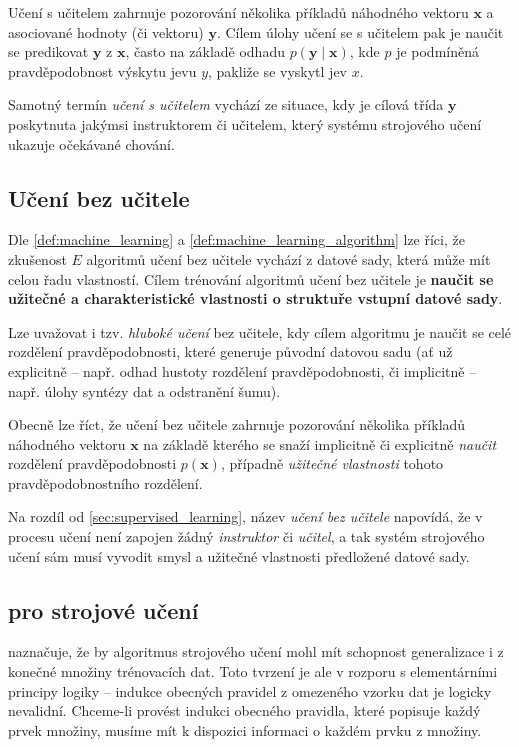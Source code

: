 Učení s učitelem zahrnuje pozorování několika příkladů náhodného vektoru $\mathbf{x}$ a asociované hodnoty (či vektoru) $\mathbf{y}$.
Cílem úlohy učení se s učitelem pak je naučit se predikovat $\mathbf{y}$ z $\mathbf{x}$, často na základě odhadu $p(\mathbf{y}\mid\mathbf{x})$, kde $p$ je podmíněná pravděpodobnost výskytu jevu $y$, pakliže se vyskytl jev $x$. \cite{Goodfellow2016}

Samotný termín \emph{učení s učitelem} vychází ze situace, kdy je cílová třída $\mathbf{y}$ poskytnuta jakýmsi instruktorem či učitelem, který systému strojového učení ukazuje očekávané chování. \cite{Goodfellow2016}
\subsection{Učení bez učitele}
\label{sec:unsupervised_learning}
Dle \autoref{def:machine_learning} a \autoref{def:machine_learning_algorithm} lze říci, že zkušenost $E$ algoritmů učení bez učitele vychází z datové sady, která může mít celou řadu vlastností.
Cílem trénování algoritmů učení bez učitele je \textbf{naučit se užitečné a charakteristické vlastnosti o struktuře vstupní datové sady}.

Lze uvažovat i tzv. \emph{hluboké učení} bez učitele, kdy cílem algoritmu je naučit se celé rozdělení pravděpodobnosti, které generuje původní datovou sadu (ať už explicitně – např. odhad hustoty rozdělení pravděpodobnosti, či implicitně – např. úlohy syntézy dat a odstranění šumu). \cite{Chollet2017}

Obecně lze říct, že učení bez učitele zahrnuje pozorování několika příkladů náhodného vektoru $\mathbf{x}$ na základě kterého se snaží implicitně či explicitně \emph{naučit} rozdělení pravděpodobnosti $p(\mathbf{x})$, případně \emph{užitečné vlastnosti} tohoto pravděpodobnostního rozdělení.

Na rozdíl od \autoref{sec:supervised_learning}, název \emph{učení bez učitele} napovídá, že v procesu učení není zapojen žádný \emph{instruktor} či \emph{učitel}, a tak systém strojového učení sám musí vyvodit smysl a užitečné vlastnosti předložené datové sady. \cite{Goodfellow2016}
\subsection{ pro strojové učení}
\label{sec:no_free_lunch}
\textcite{Vapnik2000} naznačuje, že by algoritmus strojového učení mohl mít schopnost generalizace i z konečné množiny trénovacích dat. 
Toto tvrzení je ale v rozporu s elementárními principy logiky – indukce obecných pravidel z omezeného vzorku dat je logicky nevalidní.
Chceme-li provést indukci obecného pravidla, které popisuje každý prvek množiny, musíme mít k dispozici informaci o každém prvku z množiny.  \cite{Goodfellow2016}

